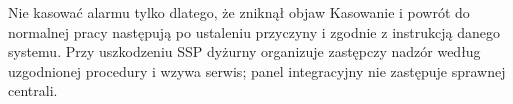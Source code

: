 \begin{note}{Nie kasować alarmu tylko dlatego, że zniknął objaw}
Kasowanie i powrót do normalnej pracy następują po ustaleniu przyczyny i zgodnie z instrukcją danego systemu. Przy uszkodzeniu SSP dyżurny organizuje zastępczy nadzór według uzgodnionej procedury i wzywa serwis; panel integracyjny nie zastępuje sprawnej centrali.
\end{note}
